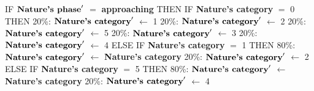 \documentclass{article}%
\begin{document}
\begin{flushleft}%
IF %
$\mbox{\textbf{Nature's phase}} '$%
$=$%
\textbf{approaching}%
\linebreak%
\hspace*{2em}%
THEN %
IF %
\textbf{Nature's category}%
$=$%
0%
\linebreak%
\hspace*{4em}%
THEN %
\linebreak%
\hspace*{6em}%
20\%: %
$\mbox{\textbf{Nature's category}} '$%
$\leftarrow$%
1%
\linebreak%
\hspace*{6em}%
20\%: %
$\mbox{\textbf{Nature's category}} '$%
$\leftarrow$%
2%
\linebreak%
\hspace*{6em}%
20\%: %
$\mbox{\textbf{Nature's category}} '$%
$\leftarrow$%
5%
\linebreak%
\hspace*{6em}%
20\%: %
$\mbox{\textbf{Nature's category}} '$%
$\leftarrow$%
3%
\linebreak%
\hspace*{6em}%
20\%: %
$\mbox{\textbf{Nature's category}} '$%
$\leftarrow$%
4%
\linebreak%
\hspace*{4em}%
ELSE %
IF %
\textbf{Nature's category}%
$=$%
1%
\linebreak%
\hspace*{6em}%
THEN %
\linebreak%
\hspace*{8em}%
80\%: %
$\mbox{\textbf{Nature's category}} '$%
$\leftarrow$%
\textbf{Nature's category}%
\linebreak%
\hspace*{8em}%
20\%: %
$\mbox{\textbf{Nature's category}} '$%
$\leftarrow$%
2%
\linebreak%
\hspace*{6em}%
ELSE %
IF %
\textbf{Nature's category}%
$=$%
5%
\linebreak%
\hspace*{8em}%
THEN %
\linebreak%
\hspace*{10em}%
80\%: %
$\mbox{\textbf{Nature's category}} '$%
$\leftarrow$%
\textbf{Nature's category}%
\linebreak%
\hspace*{10em}%
20\%: %
$\mbox{\textbf{Nature's category}} '$%
$\leftarrow$%
4%
\linebreak%
\hspace*{8em}%

\end{flushleft}
\end{document}
